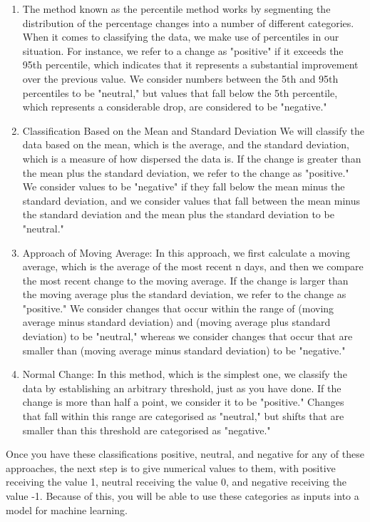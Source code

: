 \documentclass[12pt, a4paper,twoside]{report}
\theoremstyle{plain} %
\theoremstyle{definition} %
\theoremstyle{remark} %
\numberwithin{equation}{chapter}
\begin{document}
\begin{enumerate}
    \item The method known as the percentile method works by segmenting the distribution of the percentage changes into a number of different categories. When it comes to classifying the data, we make use of percentiles in our situation. For instance, we refer to a change as "positive" if it exceeds the 95th percentile, which indicates that it represents a substantial improvement over the previous value. We consider numbers between the 5th and 95th percentiles to be "neutral," but values that fall below the 5th percentile, which represents a considerable drop, are considered to be "negative."
    \item Classification Based on the Mean and Standard Deviation We will classify the data based on the mean, which is the average, and the standard deviation, which is a measure of how dispersed the data is. If the change is greater than the mean plus the standard deviation, we refer to the change as "positive." We consider values to be "negative" if they fall below the mean minus the standard deviation, and we consider values that fall between the mean minus the standard deviation and the mean plus the standard deviation to be "neutral."
    \item Approach of Moving Average: In this approach, we first calculate a moving average, which is the average of the most recent n days, and then we compare the most recent change to the moving average. If the change is larger than the moving average plus the standard deviation, we refer to the change as "positive." We consider changes that occur within the range of (moving average minus standard deviation) and (moving average plus standard deviation) to be "neutral," whereas we consider changes that occur that are smaller than (moving average minus standard deviation) to be "negative."
    \item Normal Change: In this method, which is the simplest one, we classify the data by establishing an arbitrary threshold, just as you have done. If the change is more than half a point, we consider it to be "positive." Changes that fall within this range are categorised as "neutral," but shifts that are smaller than this threshold are categorised as "negative."
\end{enumerate}

Once you have these classifications positive, neutral, and negative for any of these approaches, the next step is to give numerical values to them, with positive receiving the value 1, neutral receiving the value 0, and negative receiving the value -1. Because of this, you will be able to use these categories as inputs into a model for machine learning. 
\end{document}
